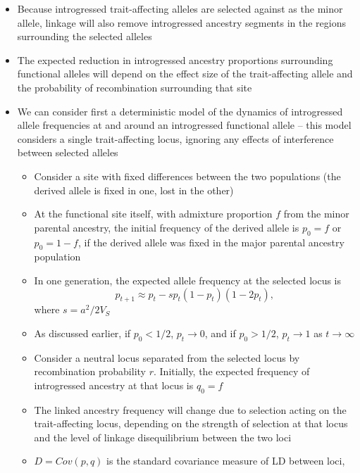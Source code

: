 \documentclass{article}
\begin{document}
\begin{itemize}
    \item Because introgressed trait-affecting alleles are selected against as the
        minor allele, linkage will also remove introgressed ancestry segments in the
        regions surrounding the selected alleles
    \item The expected reduction in introgressed ancestry proportions surrounding
        functional alleles will depend on the effect size of the trait-affecting allele
        and the probability of recombination surrounding that site
    \item We can consider first a deterministic model of the dynamics of introgressed
        allele frequencies at and around an introgressed functional allele -- this
        model considers a single trait-affecting locus, ignoring any effects of
        interference between selected alleles
        \begin{itemize}
            \item Consider a site with fixed differences between the two populations
                (the derived allele is fixed in one, lost in the other)
            \item At the functional site itself, with admixture proportion $f$ from the
                minor parental ancestry, the initial frequency of the derived allele
                is $p_0=f$ or $p_0 = 1-f$, if the derived allele was fixed in the 
                major parental ancestry population
            \item In one generation, the expected allele frequency at the selected locus
                is \[p_{t+1} \approx p_t - s p_t(1-p_t)(1-2p_t),\] where $s=a^2/2V_S$
            \item As discussed earlier, if $p_0<1/2$, $p_t\rightarrow0$, and if $p_0>1/2$,
                $p_t\rightarrow1$ as $t\rightarrow\infty$
            \item Consider a neutral locus separated from the selected locus by
                recombination probability $r$. Initially, the expected frequency
                of introgressed ancestry at that locus is $q_0=f$
            \item The linked ancestry frequency will change due to selection acting on
                the trait-affecting locus, depending on the strength of selection
                at that locus and the level of linkage disequilibrium between
                the two loci
            \item $D=Cov(p,q)$ is the standard covariance measure of LD between loci,

\end{itemize}
\end{itemize}
\end{document}
